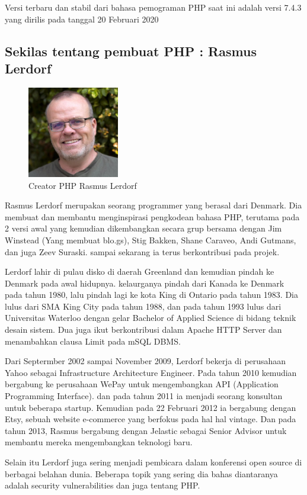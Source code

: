 \begin{enumerate}
Versi terbaru dan stabil dari bahasa pemograman PHP saat ini adalah versi 7.4.3 yang dirilis pada tanggal 20 Februari 2020

\subsection{Sekilas tentang pembuat PHP : Rasmus Lerdorf}
	\begin{figure}[H]
		\includegraphics[width=4cm]{figures/web/rasmuslerdorf.jpg}
		\centering
		\caption{Creator PHP Rasmus Lerdorf }
	\end{figure}
Rasmus Lerdorf merupakan seorang programmer yang berasal dari Denmark. Dia membuat dan membantu menginspirasi pengkodean bahasa PHP, terutama pada 2 versi awal yang kemudian dikembangkan secara grup bersama dengan Jim Winstead (Yang membuat blo.gs), Stig Bakken, Shane Caraveo, Andi Gutmans, dan juga Zeev Suraski. sampai sekarang ia terus berkontribusi pada projek.

Lerdorf lahir di pulau disko di daerah Greenland dan kemudian pindah ke Denmark pada awal hidupnya. kelaurganya pindah dari Kanada ke Denmark pada tahun 1980, lalu pindah lagi ke kota King di Ontario pada tahun 1983. Dia lulus dari SMA King City pada tahun 1988, dan pada tahun 1993 lulus dari Universitas Waterloo dengan gelar  Bachelor of Applied Science di bidang teknik desain sistem. Dua juga ikut berkontribusi dalam Apache HTTP Server dan menambahkan clausa Limit pada mSQL DBMS. 

Dari Septermber 2002 sampai November 2009, Lerdorf bekerja di perusahaan Yahoo sebagai Infrastructure Architecture Engineer. Pada tahun 2010 kemudian bergabung ke perusahaan WePay untuk mengembangkan API (Application Programming Interface). dan pada tahun 2011 ia menjadi seorang konsultan untuk beberapa startup. Kemudian pada 22 Februari 2012 ia bergabung dengan Etsy, sebuah website e-commerce yang berfokus pada hal hal vintage. Dan pada tahun 2013, Rasmus bergabung dengan Jelastic sebagai Senior Advisor untuk membantu mereka mengembangkan teknologi baru.

Selain itu Lerdorf juga sering menjadi pembicara dalam konferensi open source di berbagai belahan dunia. Beberapa topik yang sering dia bahas diantaranya adalah security vulnerabilities dan juga tentang PHP.


\end{enumerate}
